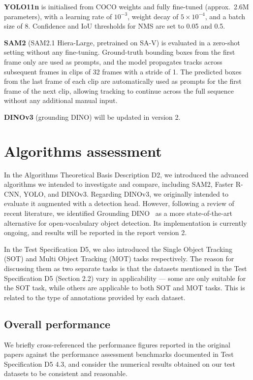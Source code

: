\documentclass[11pt]{article}
\begin{document}
\textbf{YOLO11n} is initialised from COCO weights and fully fine-tuned (approx.\ 2.6M parameters), 
with a learning rate of $10^{-3}$, weight decay of $5 \times 10^{-4}$, and a batch size of 8. 
Confidence and IoU thresholds for NMS are set to 0.05 and 0.5.

\textbf{SAM2} (SAM2.1 Hiera-Large, pretrained on SA-V) is evaluated in a zero-shot setting without any fine-tuning. 
Ground-truth bounding boxes from the first frame only are used as prompts, 
and the model propagates tracks across subsequent frames in clips of 32 frames with a stride of 1.
The predicted boxes from the last frame of each clip are automatically used as prompts for the first frame of the 
next clip, allowing tracking to continue across the full sequence without any additional manual input.

\textbf{DINOv3} (grounding DINO) will be updated in version 2.

\hypertarget{algorithms-assessment}{%
\section{Algorithms assessment}\label{algorithms-assessment}}

In the Algorithms Theoretical Basis Description D2, we introduced the advanced algorithms we intended to investigate and compare, including SAM2, Faster R-CNN, YOLO, and DINOv3.
Regarding DINOv3, we originally intended to evaluate it augmented with a detection head. 
However, following a review of recent literature, we identified Grounding DINO~\cite{liu2024grounding, ren2024grounding} as a more state-of-the-art alternative for open-vocabulary object detection. 
Its implementation is currently ongoing, and results will be reported in the report version 2.

In the Test Specification D5, we also introduced the Single Object Tracking (SOT) and Multi Object Tracking (MOT) tasks respectively. 
The reason for discussing them as two separate tasks is that the datasets mentioned in the Test Specification D5 (Section 2.2) vary in 
applicability — some are only suitable for the SOT task, while others are applicable to both SOT and MOT tasks. 
This is related to the type of annotations provided by each dataset.

\hypertarget{Overall performance}{%
\subsection{Overall performance}\label{Overall performance}}
We briefly cross-referenced the performance figures reported in the original papers against the performance assessment benchmarks documented 
in Test Specification D5 4.3, and consider the numerical results obtained on our test datasets to be consistent and reasonable.
\end{document}

